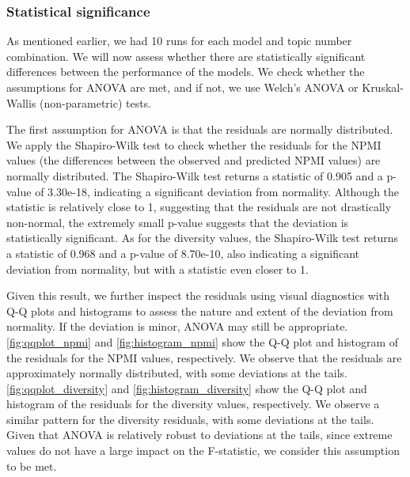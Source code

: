 \subsubsection{Statistical significance}
As mentioned earlier, we had 10 runs for each model and topic number combination. We will now assess whether there are statistically significant differences between the performance of the models. We check whether the assumptions for ANOVA are met, and if not, we use Welch's ANOVA or Kruskal-Wallis (non-parametric) tests.

The first assumption for ANOVA is that the residuals are normally distributed. We apply the Shapiro-Wilk test to check whether the residuals for the NPMI values (the differences between the observed and predicted NPMI values) are normally distributed. The Shapiro-Wilk test returns a statistic of 0.905 and a p-value of 3.30e-18, indicating a significant deviation from normality. Although the statistic is relatively close to 1, suggesting that the residuals are not drastically non-normal, the extremely small p-value suggests that the deviation is statistically significant. As for the diversity values, the Shapiro-Wilk test returns a statistic of 0.968 and a p-value of 8.70e-10, also indicating a significant deviation from normality, but with a statistic even closer to 1.

Given this result, we further inspect the residuals using visual diagnostics with Q-Q plots and histograms to assess the nature and extent of the deviation from normality. If the deviation is minor, ANOVA may still be appropriate. \cref{fig:qqplot_npmi} and \cref{fig:histogram_npmi} show the Q-Q plot and histogram of the residuals for the NPMI values, respectively. We observe that the residuals are approximately normally distributed, with some deviations at the tails. \cref{fig:qqplot_diversity} and \cref{fig:histogram_diversity} show the Q-Q plot and histogram of the residuals for the diversity values, respectively. We observe a similar pattern for the diversity residuals, with some deviations at the tails. Given that ANOVA is relatively robust to deviations at the tails, since extreme values do not have a large impact on the F-statistic, we consider this assumption to be met.

